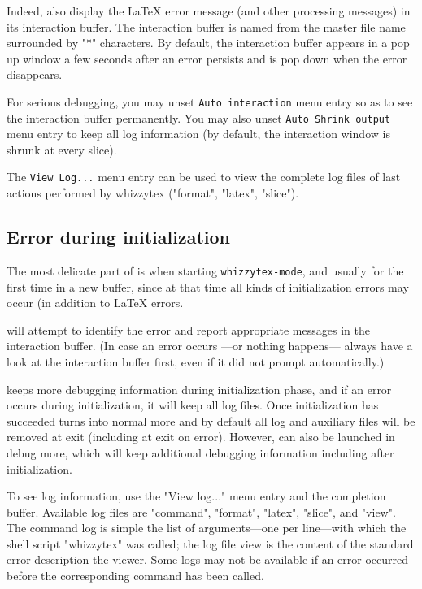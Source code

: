 \documentclass[12pt]{article}
\begin{document}
Indeed, {\whizzy} also display the {\LaTeX} error message
(and other processing messages) in its interaction buffer.
The interaction buffer is named from the master file name surrounded
by \lst"*" characters. By default, the interaction buffer appears
in a pop up window a few seconds after an error persists and is pop down
when the error disappears.

For serious debugging, you may unset {\tt Auto interaction} menu entry so as
to see the interaction buffer permanently. You may also unset {\tt Auto
Shrink output} menu entry to keep all log information (by default, the
interaction window is shrunk at every slice).

The {\tt View Log...} menu entry can be used to view the complete log files of
last actions performed by whizzytex (\lst"format", \lst"latex",
\lst"slice").

\subsection {Error during initialization}

The most delicate part of {\whizzy} is when starting {\tt whizzytex-mode},
and usually for the first time in a new buffer, since at that time all kinds
of initialization errors may occur (in addition to {\LaTeX} errors.

{\whizzy} will attempt to identify the error and report appropriate messages
in the interaction buffer. (In case an error occurs ---or nothing happens---
always have a look at the interaction buffer first, even if it did not
prompt automatically.)

{\whizzy} keeps more debugging information during initialization phase,
and if an error occurs during initialization, it will keep all log files.
Once initialization has succeeded  {\whizzy} turns into normal more and
by default all log and auxiliary files will be removed at exit
(including at exit on error). However, {\whizzy} can also be launched in
debug more, which will keep additional debugging information including
after initialization.

To see log information, use the \lst"View log..." menu entry
and the completion buffer. Available log files are \lst"command",
\lst"format", \lst"latex", \lst"slice", and \lst"view".
The command log is simple the list of arguments---one per line---with which
the shell script \lst"whizzytex" was called; the log file view is the
content of the standard error description the viewer.  Some logs may not be
available if an error occurred before the corresponding command has been
called.
\end{document}

